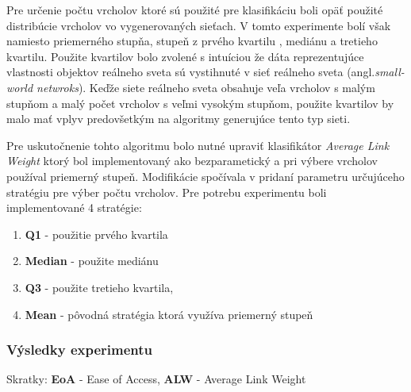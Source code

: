 \documentclass[slovak,master,dept460,male,cpp,cpdeclaration]{diploma}
\begin{document}
Pre určenie počtu vrcholov ktoré sú použité pre klasifikáciu boli opäť použité distribúcie vrcholov vo vygenerovaných sieťach. V tomto experimente bolí však namiesto priemerného stupňa, stupeň z prvého kvartilu , mediánu  a tretieho kvartilu. Použite kvartilov bolo zvolené s intuíciou že dáta reprezentujúce vlastnosti objektov reálneho sveta sú  vystihnuté v sieť reálneho sveta (angl.\textit{small-world netwroks}). Keďže siete reálneho sveta obsahuje veľa vrcholov s malým stupňom a malý počet vrcholov s veľmi vysokým stupňom, použite kvartilov by malo mať vplyv predovšetkým na algoritmy generujúce tento typ sieti.

Pre uskutočnenie tohto algoritmu bolo nutné upraviť klasifikátor \textit{Average Link Weight} ktorý bol implementovaný ako bezparametický a pri výbere vrcholov používal priemerný stupeň. Modifikácie spočívala v pridaní parametru určujúceho stratégiu pre výber počtu vrcholov. Pre potrebu experimentu boli implementované 4 stratégie:
\begin{enumerate}
\item \textbf{Q1} - použitie prvého kvartila
\item \textbf{Median} - použite mediánu
\item \textbf{Q3} - použite tretieho kvartila,
\item \textbf{Mean} - pôvodná stratégia ktorá využíva priemerný stupeň
\end{enumerate}

\subsubsection{Výsledky experimentu}
Skratky: \textbf{EoA} - Ease of Access, \textbf{ALW} - Average Link Weight
\end{document}

